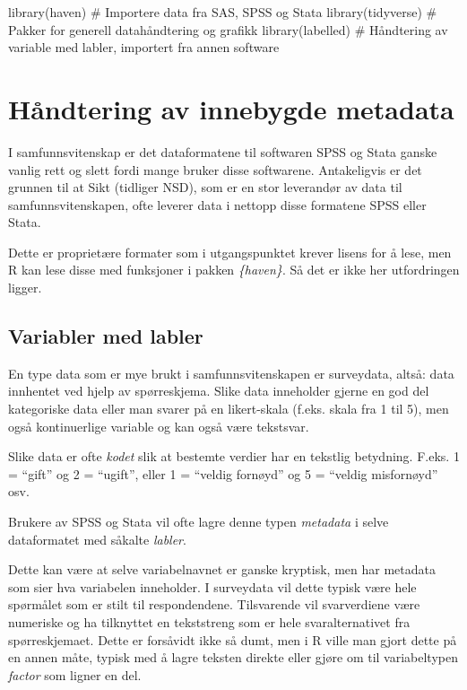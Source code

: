 \documentclass[
  letterpaper,
  DIV=11,
  numbers=noendperiod]{scrreprt}
\newenvironment{Shaded}{\begin{snugshade}}{\end{snugshade}}
\newcommand{\CommentTok}[1]{\textcolor[rgb]{0.37,0.37,0.37}{#1}}
\newcommand{\FunctionTok}[1]{\textcolor[rgb]{0.28,0.35,0.67}{#1}}
\newcommand{\NormalTok}[1]{\textcolor[rgb]{0.00,0.23,0.31}{#1}}
\begin{document}
\begin{Shaded}
\begin{Highlighting}[]
\FunctionTok{library}\NormalTok{(haven)       }\CommentTok{\# Importere data fra SAS, SPSS og Stata}
\FunctionTok{library}\NormalTok{(tidyverse)   }\CommentTok{\# Pakker for generell datahåndtering og grafikk}
\FunctionTok{library}\NormalTok{(labelled)    }\CommentTok{\# Håndtering av variable med labler, importert fra annen software}
\end{Highlighting}
\end{Shaded}

\hypertarget{huxe5ndtering-av-innebygde-metadata}{%
\section{Håndtering av innebygde
metadata}\label{huxe5ndtering-av-innebygde-metadata}}

I samfunnsvitenskap er det dataformatene til softwaren SPSS og Stata
ganske vanlig rett og slett fordi mange bruker disse softwarene.
Antakeligvis er det grunnen til at Sikt (tidliger NSD), som er en stor
leverandør av data til samfunnsvitenskapen, ofte leverer data i nettopp
disse formatene SPSS eller Stata.

Dette er proprietære formater som i utgangspunktet krever lisens for å
lese, men R kan lese disse med funksjoner i pakken \emph{\{haven\}}. Så
det er ikke her utfordringen ligger.

\hypertarget{variabler-med-labler}{%
\subsection{Variabler med labler}\label{variabler-med-labler}}

En type data som er mye brukt i samfunnsvitenskapen er surveydata,
altså: data innhentet ved hjelp av spørreskjema. Slike data inneholder
gjerne en god del kategoriske data eller man svarer på en likert-skala
(f.eks. skala fra 1 til 5), men også kontinuerlige variable og kan også
være tekstsvar.

Slike data er ofte \emph{kodet} slik at bestemte verdier har en tekstlig
betydning. F.eks. 1 = ``gift'' og 2 = ``ugift'', eller 1 = ``veldig
fornøyd'' og 5 = ``veldig misfornøyd'' osv.

Brukere av SPSS og Stata vil ofte lagre denne typen \emph{metadata} i
selve dataformatet med såkalte \emph{labler}.

Dette kan være at selve variabelnavnet er ganske kryptisk, men har
metadata som sier hva variabelen inneholder. I surveydata vil dette
typisk være hele spørmålet som er stilt til respondendene. Tilsvarende
vil svarverdiene være numeriske og ha tilknyttet en tekststreng som er
hele svaralternativet fra spørreskjemaet. Dette er forsåvidt ikke så
dumt, men i R ville man gjort dette på en annen måte, typisk med å lagre
teksten direkte eller gjøre om til variabeltypen \emph{factor} som
ligner en del.
\end{document}
